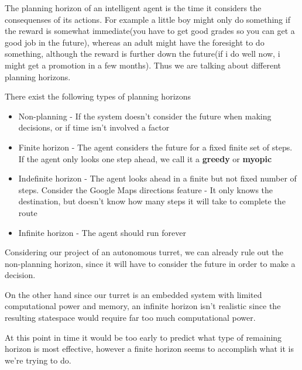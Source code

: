 The planning horizon of an intelligent agent is the time it considers the consequenses of its actions.
For example a little boy might only do something if the reward is somewhat
immediate(you have to get good grades so you can get a good job in the future),
 whereas an adult might have the foresight to do something, although the reward
 is further down the future(if i do well now, i might get a promotion in a few
 months). Thus we are talking about different planning horizons.

There exist the following types of planning horizons
\begin{itemize}
	\item Non-planning - If the system doesn’t consider the future when making decisions, or if time isn’t involved a factor
	\item Finite horizon - The agent considers the future for a fixed finite set of steps. If the agent only looks one step ahead, we call it a \textbf{greedy} or \textbf{myopic}
	\item Indefinite horizon - The agent looks ahead in a finite but not fixed number of steps. Consider the Google Maps directions feature - It only knows the destination, but doesn’t know how many steps it will take to complete the route
	\item Infinite horizon - The agent should run forever	
\end{itemize}

Considering our project of an autonomous turret, we can already rule out the non-planning horizon, since it will have to consider the future in order to make a decision.

On the other hand since our turret is an embedded system with limited computational power and memory, an infinite horizon isn’t realistic since the resulting statespace would require far too much computational power.

At this point in time it would be too early to predict what type of remaining horizon is most effective, however a finite horizon seems to accomplish what it is we’re trying to do.




